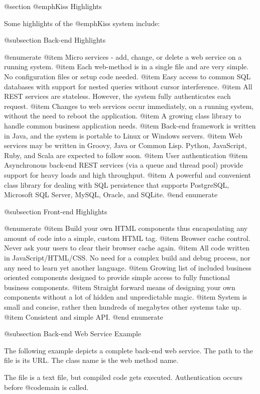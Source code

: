 @section @emph{Kiss} Highlights

Some highlights of the @emph{Kiss} system include:

@subsection Back-end Highlights

@enumerate
@item
Micro services - add, change, or delete a web service on a running system.
@item
Each web-method is in a single file and are very simple.  No
configuration files or setup code needed.
@item
Easy access to common SQL databases with support for nested queries
without cursor interference.
@item
All REST services are stateless.  However, the system fully
authenticates each request.
@item
Changes to web services occur immediately, on a running system,
without the need to reboot the application.
@item
A growing class library to handle common business application needs.
@item
Back-end framework is written in Java, and the system is portable to
Linux or Windows servers.
@item
Web services may be written in Groovy, Java or Common Lisp.  Python,
JavaScript, Ruby, and Scala are expected to follow soon.
@item
User authentication
@item
Asynchronous back-end REST services (via a queue and thread pool)
provide support for heavy loads and high throughput.
@item
A powerful and convenient class library for dealing with SQL persistence that
supports PostgreSQL, Microsoft SQL Server, MySQL, Oracle, and SQLite.
@end enumerate

@subsection Front-end Highlights

@enumerate
@item
Build your own HTML components thus encapsulating any amount of code
into a simple, custom HTML tag.
@item
Browser cache control.  Never ask your users to clear their browser cache again.
@item
All code written in JavaScript/HTML/CSS.  No need for a complex build
and debug process, nor any need to learn yet another language.
@item
Growing list of included business oriented components designed to
provide simple access to fully functional business components.
@item
Straight forward means of designing your own components without a lot
of hidden and unpredictable magic.
@item
System is small and concise, rather then hundreds of megabytes other
systems take up.
@item
Consistent and simple API.
@end enumerate

@subsection Back-end Web Service Example


The following example depicts a complete back-end web service.  The
path to the file is its URL.  The class name is the web method name.

The file is a text file, but compiled code gets executed.
Authentication occurs before @code{main} is called.

